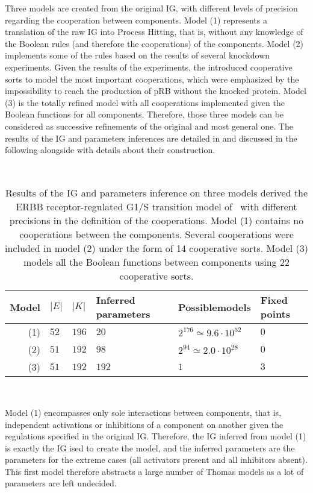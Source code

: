 Three models are created from the original IG, with different levels of precision regarding the cooperation between components.
Model (1) represents a translation of the raw IG into Process Hitting, that is,
without any knowledge of the Boolean rules (and therefore the cooperations) of the components.
Model (2) implements some of the rules based on the results of several knockdown experiments.
Given the results of the experiments, the introduced cooperative sorts to model the most important cooperations,
which were emphasized by the impossibility to reach the production of pRB without the knocked protein.
Model (3) is the totally refined model with all cooperations implemented given the Boolean functions for all components.
Therefore, those three models can be considered as successive refinements of the original and most general one.
The results of the IG and parameters inferences are detailed in 
and discussed in the following alongside with details about their construction.

\begin{table}[ht]
~\hfill%
  \begin{tabular}{r|l|l|m{2cm}|m{2.5cm}|m{1.5cm}}
    \textbf{Model} & \textbf{$|E|$} & \textbf{$|K|$} & \textbf{Inferred parameters} & \textbf{Possible\newline models} & \textbf{Fixed points}
  \\\hline\hline
    (1) & $52$ & $196$ & $20$ & $2^{176}\simeq 9.6\cdot10^{52}$ & $0$   %
  \\\hline
    (2) & $51$ & $192$ & $98$ & $2^{94}\simeq 2.0\cdot10^{28}$ & $0$    %
  \\\hline
    (3) & $51$ & $192$ & $192$ & $1$ & $3$                              %
  \\\hline
  \end{tabular}
\hfill~%
  \caption{Results of the IG and parameters inference on three models
  derived the ERBB receptor-regulated G1/S transition model of~\cite{Sahin09}
  with different precisions in the definition of the cooperations.
  Model (1) contains no cooperations between the components.
  Several cooperations were included in model (2) under the form of 14 cooperative sorts.
  Model (3) models all the Boolean functions between components using 22 cooperative sorts.}
  \label{tb:egfr20}
\end{table}

Model (1) encompasses only sole interactions between components, that is,
independent activations or inhibitions of a component on another given the regulations specified in the original IG.
Therefore, the IG inferred from model (1) is exactly the IG ised to create the model, and the inferred parameters
are the parameters for the extreme cases (all activators present and all inhibitors absent).
This first model therefore abstracts a large number of Thomas models as a lot of parameters are left undecided.

